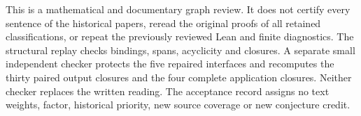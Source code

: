 \documentclass[11pt,a4paper]{article}
\begin{document}
This is a mathematical and documentary graph review. It does not certify
every sentence of the historical papers, reread the original proofs of all
retained classifications, or repeat the previously reviewed Lean and finite
diagnostics. The structural replay checks bindings, spans, acyclicity and
closures. A separate small independent checker protects the five repaired
interfaces and recomputes the thirty paired output closures and the four
complete application closures. Neither checker replaces the written reading.
The acceptance record assigns no text weights, factor, historical priority,
new source coverage or new conjecture credit.
\end{document}
